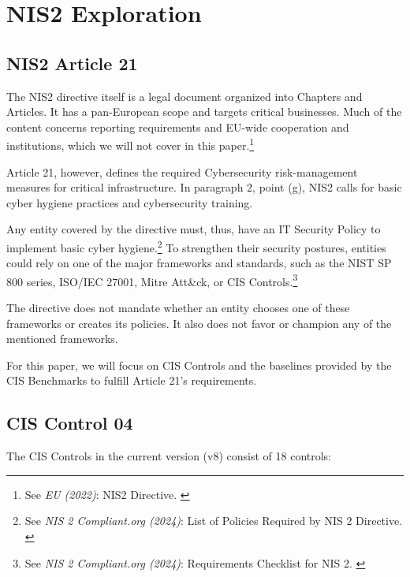 %
%

\pagebreak
\section{NIS2 Exploration}

\onehalfspacing

\subsection{NIS2 Article 21}

The NIS2 directive itself is a legal document organized into Chapters and Articles. It has a pan-European scope and targets critical businesses. Much of the content concerns reporting requirements and EU-wide cooperation and institutions, which we will not cover in this paper.\footnote{See \textit{EU (2022)}: NIS2 Directive. \cite{nis2}}

Article 21, however, defines the required Cybersecurity risk-management measures for critical infrastructure. In paragraph 2, point (g), NIS2 calls for basic cyber hygiene practices and cybersecurity training.

Any entity covered by the directive must, thus, have an IT Security Policy to implement basic cyber hygiene.\footnote{See \textit{NIS 2 Compliant.org (2024)}: List of Policies Required by NIS 2 Directive. \cite{nisPols}} To strengthen their security postures, entities could rely on one of the major frameworks and standards, such as the NIST SP 800 series, ISO/IEC 27001, Mitre Att\&ck, or CIS Controls.\footnote{See \textit{NIS 2 Compliant.org (2024)}: Requirements Checklist for NIS 2. \cite{nisReqs}}

The directive does not mandate whether an entity chooses one of these frameworks or creates its policies. It also does not favor or champion any of the mentioned frameworks.

For this paper, we will focus on CIS Controls and the baselines provided by the CIS Benchmarks to fulfill Article 21's requirements.

\subsection{CIS Control 04}

The CIS Controls in the current version (v8) consist of 18 controls:

